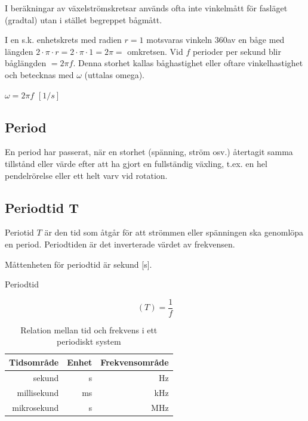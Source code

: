 I beräkningar av växelströmskretsar används ofta inte vinkelmått för fasläget
(gradtal) utan i stället begreppet bågmått.

I en s.k. enhetskrets med radien \(r = 1\) motsvaras vinkeln 360\degree av en
båge med längden \(2 \cdot \pi \cdot r= 2 \cdot \pi \cdot 1 = 2 \pi =\)
omkretsen.
Vid \(f\) perioder per sekund blir båglängden \(= 2\pi f\).
Denna storhet kallas båghastighet eller oftare vinkelhastighet och betecknas
med \(\omega\) (uttalas omega).

\(\omega= 2\pi f\) \([1/s]\)

\subsection{Period}

En period har passerat, när en storhet (spänning, ström osv.) återtagit samma
tillstånd eller värde efter att ha gjort en fullständig växling, t.ex. en hel
pendelrörelse eller ett helt varv vid rotation.

\subsection{Periodtid T}

Periotid \(T\) är den tid som åtgår för att strömmen eller spänningen ska
genomlöpa en period. Periodtiden är det inverterade värdet av frekvensen.

Måttenheten för periodtid är sekund [s].

Periodtid

\begin{equation*}
	(T) = \dfrac{1}{f}
\end{equation*} 


\begin{table}[h]
	\centering
	\begin{tabular}{rrr}
		 Tidsområde &     Enhet & Frekvensområde \\ \hline
		     sekund &         s &             Hz \\
		millisekund &        ms &            kHz \\
		mikrosekund & \textmu s &            MHz
	\end{tabular}
	\caption{Relation mellan tid och frekvens i ett periodiskt system}
\end{table}

